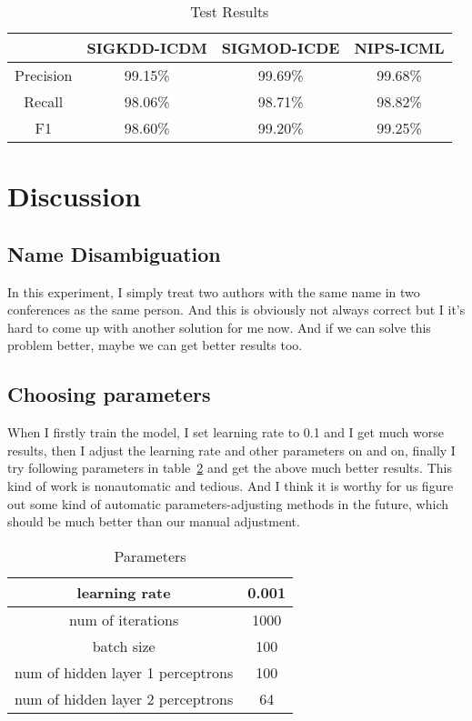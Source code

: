 \documentclass{sigkddExp}
\begin{document}
\begin{table}
\centering
\caption{Test Results}
\label{tab:results}
\begin{tabular}{|c|c|c|c|} \hline
 & SIGKDD-ICDM & SIGMOD-ICDE & NIPS-ICML \\ \hline
Precision & 99.15\% & 99.69\% & 99.68\% \\ \hline
Recall & 98.06\% & 98.71\% & 98.82\% \\ \hline
F1 & 98.60\% & 99.20\% & 99.25\% \\
\hline\end{tabular}
\end{table}


\section{Discussion}
\subsection{Name Disambiguation}
In this experiment, I simply treat two authors with the same name in two 
conferences as the same person. And this is obviously not always correct
but I it's hard to come up with another solution for me now. And if we
can solve this problem better, maybe we can get better results too.

\subsection{Choosing parameters}
When I firstly train the model, I set learning rate to 0.1 and I get much
worse results, then I adjust the learning rate and other parameters on and on,
finally I try following parameters in table~\ref{tab:params} and get the 
above much better results. This kind of work is nonautomatic and tedious.
And I think it is worthy for us figure out some kind of automatic 
parameters-adjusting methods in the future, which should be much better 
than our manual adjustment.

\begin{table}
\centering
\caption{Parameters}
\label{tab:params}
\begin{tabular}{|c|c|} \hline
learning rate & 0.001 \\ \hline
num of iterations & 1000 \\ \hline
batch size & 100 \\ \hline
num of hidden layer 1 perceptrons & 100 \\ \hline
num of hidden layer 2 perceptrons & 64 \\
\hline\end{tabular}
\end{table}
\end{document}
